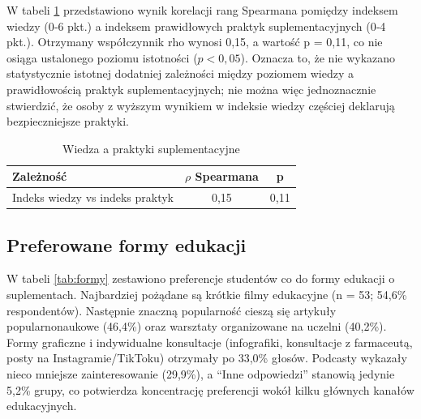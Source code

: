 %
%
%
% 

W tabeli \ref{tab:wiedza-praktyki} przedstawiono wynik korelacji rang Spearmana pomiędzy indeksem wiedzy (0‐6 pkt.) a indeksem prawidłowych praktyk suplementacyjnych (0‐4 pkt.). Otrzymany współczynnik rho wynosi 0,15, a wartość p = 0,11, co nie osiąga ustalonego poziomu istotności ($p < 0,05$). Oznacza to, że nie wykazano statystycznie istotnej dodatniej zależności między poziomem wiedzy a prawidłowością praktyk suplementacyjnych; nie można więc jednoznacznie stwierdzić, że osoby z wyższym wynikiem w indeksie wiedzy częściej deklarują bezpieczniejsze praktyki.

\begin{table}[H]
    \centering
    \caption{Wiedza a praktyki suplementacyjne}
    \label{tab:wiedza-praktyki}
    \begin{tabular}{|l|c|c|}
        \hline
        \textbf{Zależność} & \textbf{$\rho$ Spearmana} & \textbf{p} \\
        \hline
        \hline
        Indeks wiedzy vs indeks praktyk & 0,15 & 0,11 \\
        \hline
    \end{tabular}
\end{table}


\subsection{Preferowane formy edukacji}

% 
% 

W tabeli \ref{tab:formy} zestawiono preferencje studentów co do formy edukacji o suplementach. Najbardziej pożądane są krótkie filmy edukacyjne (n = 53; 54,6\% respondentów). Następnie znaczną popularność cieszą się artykuły popularnonaukowe (46,4\%) oraz warsztaty organizowane na uczelni (40,2\%). Formy graficzne i indywidualne konsultacje (infografiki, konsultacje z farmaceutą, posty na Instagramie/TikToku) otrzymały po 33,0\% głosów. Podcasty wykazały nieco mniejsze zainteresowanie (29,9\%), a \enquote{Inne odpowiedzi} stanowią jedynie 5,2\% grupy, co potwierdza koncentrację preferencji wokół kilku głównych kanałów edukacyjnych.

